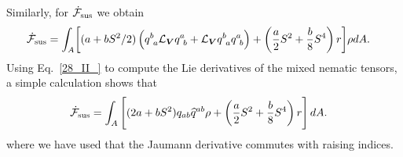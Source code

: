 Similarly, for $\dot{\mathcal{F}}_{\rm sus}$ we obtain %
\begin{align} \label{48_II}
	\dot{\mathcal{F}}_{\rm sus}  =  {\int_A} & \bigg[(a+bS^2/2)\left(q_{~a}^b \mathcal{L}_{\bm{V}} q^{a}_{~b} + \mathcal{L}_{\bm{V}}q_{~a}^b  q^{a}_{~b} \right) +    \left(\frac{a}{2}S^2 + \frac{b}{8}S^4\right)r \bigg]  \rho d A.
\end{align}
Using Eq.~\eqref{28_II_} to compute the Lie derivatives of the mixed nematic tensors, a simple calculation shows that
\begin{align} \label{49_II}
	\dot{\mathcal{F}}_{\rm sus}  =   {\int_A}& \left[ (2a+bS^2)q_{ab} \widehat{q}^{ab} \rho + \left(\frac{a}{2}S^2 + \frac{b}{8}S^4\right)r  \right]d A.
\end{align}
where we have used that the Jaumann derivative commutes with raising  indices.

